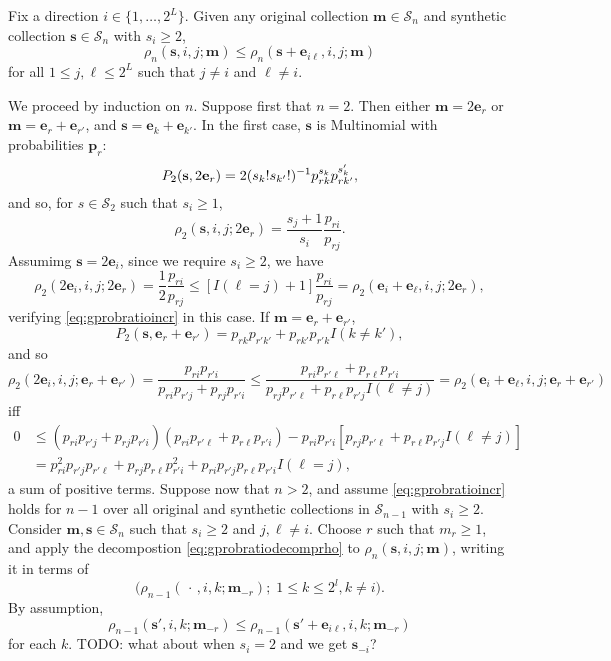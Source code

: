 \documentclass[11pt,draft]{article}
\newcommand{\Ssp}{\mathcal{S}}
\newcommand{\sv}{\mathbf{s}}
\newcommand{\mv}{\mathbf{m}}
\newcommand{\ev}{\mathbf{e}}
\begin{document}
\begin{prop}
Fix a direction $i\in \{1,\dots,2^L\}$.
Given any original collection $\mv\in\Ssp_n$ and synthetic collection
$\sv\in\Ssp_n$ with $s_i \geq 2$,
\begin{equation} \label{eq:gprobratioincr}
\rho_n(\sv, i, j; \mv) \leq \rho_n(\sv + \ev_{i\ell}, i, j; \mv)
\end{equation}
for all $1 \leq j,\ell \leq 2^L$ such that $j\neq i$ and $\ell\neq i$.
\end{prop}
\begin{pf}
We proceed by induction on $n$.
Suppose first that $n=2$.
Then either $\mv = 2\ev_r$ or $\mv = \ev_r + \ev_{r'}$, and
$\sv = \ev_k + \ev_{k'}$.
In the first case, $\sv$ is Multinomial with probabilities $\textbf{p}_{r}$:
\[ P_2(\sv, 2\ev_r) = 2\inv{(s_k!s_{k'}!)} p_{rk}^{s_k}p_{rk'}^{s_k'}, \]
and so, for $s\in\Ssp_2$ such that $s_i \geq 1$,
\[ \rho_2(\sv, i, j; 2\ev_r) = \frac{s_j + 1}{s_i}\frac{p_{ri}}{p_{rj}}.
\]
Assumimg $\sv = 2\ev_i$, since we require $s_i \geq 2$, we have
\[ \rho_2(2\ev_i, i, j; 2\ev_r) = \frac{1}{2}\frac{p_{ri}}{p_{rj}} \leq
[I(\ell = j) + 1]\frac{p_{ri}}{p_{rj}} =
\rho_2(\ev_i + \ev_\ell, i, j; 2\ev_r),
\]
verifying \eqref{eq:gprobratioincr} in this case.
If $\mv = \ev_r + \ev_{r'}$,
\[ P_2(\sv, \ev_r + \ev_{r'}) = p_{rk}p_{r'k'} + p_{rk'}p_{r'k}I(k \neq k'), \]
and so
\[ \rho_2(2\ev_i, i, j; \ev_r + \ev_{r'}) =
\frac{p_{ri}p_{r'i}}{p_{ri}p_{r'j} + p_{rj}p_{r'i}} \leq
\frac{p_{ri}p_{r'\ell} + p_{r\ell}p_{r'i}}
{p_{rj}p_{r'\ell} + p_{r\ell}p_{r'j}I(\ell \neq j)} =
\rho_2(\ev_i + \ev_\ell, i, j; \ev_r + \ev_{r'})
\]
iff
\begin{align*}
0 &\leq (p_{ri}p_{r'j} + p_{rj}p_{r'i})(p_{ri}p_{r'\ell} + p_{r\ell}p_{r'i}) -
p_{ri}p_{r'i}[p_{rj}p_{r'\ell} + p_{r\ell}p_{r'j}I(\ell \neq j)] \\
&= p_{ri}^2p_{r'j}p_{r'\ell} + p_{rj}p_{r\ell}p_{r'i}^2
+ p_{ri}p_{r'j}p_{r\ell}p_{r'i}
I(\ell = j),
\end{align*}
a sum of positive terms.
Suppose now that $n>2$, and assume \eqref{eq:gprobratioincr} holds for $n-1$
over all original and synthetic collections in $\Ssp_{n-1}$ with $s_i \geq 2$.
Consider $\mv,\sv\in\Ssp_n$ such that $s_i\geq 2$ and $j,\ell\neq i$.
Choose $r$ such that $m_r \geq 1$, and apply the decompostion
\eqref{eq:gprobratiodecomprho} to $\rho_n(\sv, i, j; \mv)$, writing it in terms
of
\[ \Big(\rho_{n-1}(\,\cdot\,,i, k; \mv_{-r});\; 1 \leq k \leq 2^l,
k\neq i\big). \]
By assumption,
\[ \rho_{n-1}(\sv',i, k; \mv_{-r}) \leq
\rho_{n-1}(\sv' + \ev_{i\ell} ,i, k; \mv_{-r}) \]
for each $k$.
TODO: what about when $s_i = 2$ and we get $\sv_{-i}$?
\end{pf}
\end{document}
